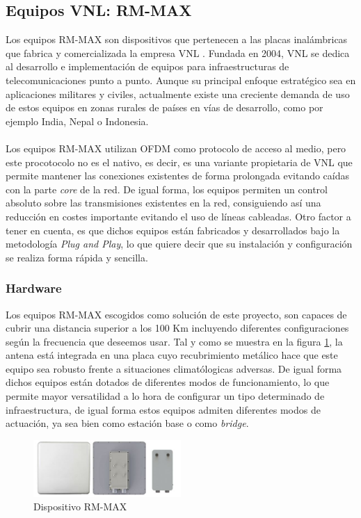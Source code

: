 \subsection{Equipos VNL: RM-MAX}
Los equipos RM-MAX son dispositivos que pertenecen a las placas inalámbricas que fabrica y comercializada la empresa VNL \cite{VNL}. Fundada en 2004, VNL se dedica al desarrollo e implementación de equipos para infraestructuras de telecomunicaciones punto a punto. Aunque su principal enfoque estratégico sea en aplicaciones militares y civiles, actualmente existe una creciente demanda de uso de estos equipos en zonas rurales de países en vías de desarrollo, como por ejemplo India, Nepal o Indonesia.\\\\

Los equipos RM-MAX  utilizan OFDM como protocolo de acceso al medio, pero este procotocolo no es el nativo, es decir, es una variante propietaria de VNL que permite mantener las conexiones existentes de forma prolongada evitando caídas con la parte \textit{core} de la red. De igual forma, los equipos permiten un control absoluto sobre las transmisiones existentes en la red, consiguiendo así una reducción en costes importante evitando el uso de líneas cableadas. Otro factor a tener en cuenta, es que dichos equipos están fabricados y desarrollados bajo la metodología \textit{Plug and Play}, lo que quiere decir que su instalación y configuración se realiza forma rápida y sencilla.

\subsubsection{Hardware}
Los equipos RM-MAX escogidos como solución de este proyecto, son capaces de cubrir una distancia superior a los 100 Km incluyendo diferentes configuraciones según la frecuencia que deseemos usar. Tal y como se muestra en la figura \ref{rm_max}, la antena está integrada en una placa cuyo recubrimiento metálico hace que este equipo sea robusto frente a situaciones climatólogicas adversas. De igual forma dichos equipos están dotados de diferentes modos de funcionamiento, lo que permite mayor versatilidad a lo hora de configurar un tipo determinado de infraestructura, de igual forma estos equipos admiten diferentes modos de actuación, ya sea bien como estación base o como \textit{bridge}.

\begin{figure}[H]
		\centering
		\includegraphics[width=0.5\textwidth]{img/rm_max.JPG}
		\caption{Dispositivo RM-MAX}
		\label{rm_max}
	\end{figure}
	
